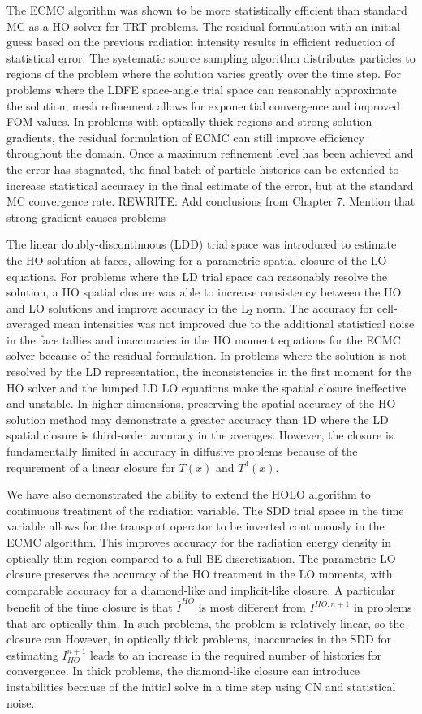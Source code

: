 The ECMC algorithm was shown to be more statistically efficient than standard MC as a HO
solver for TRT problems.  The residual formulation with an initial guess based on the
previous radiation intensity results in efficient reduction of statistical error.  The
systematic source sampling algorithm distributes particles to regions of the problem where the
solution varies greatly over the time step.  For problems where the LDFE space-angle trial space
can reasonably approximate the solution, mesh refinement allows for exponential
convergence and improved FOM values.   In problems with optically
thick regions and strong solution gradients, the residual formulation of ECMC can still
improve efficiency throughout the domain.  Once a maximum refinement level has been
achieved and the error has stagnated, the final batch of particle histories can be 
extended to increase statistical accuracy in the final estimate of the error, but at the
standard MC convergence rate.
REWRITE: Add conclusions from Chapter 7. Mention that strong gradient causes problems

The linear doubly-discontinuous (LDD) trial space was introduced to estimate the HO
solution at faces, allowing for a parametric spatial closure of the LO equations. 
For problems where the LD trial space can reasonably resolve the solution, a 
HO spatial closure was able to increase consistency between the HO and LO solutions and improve
accuracy in the L$_2$ norm.  The accuracy for cell-averaged mean intensities was not improved due to the additional statistical noise
in the face tallies and inaccuracies in the HO moment equations for the ECMC solver because of the residual formulation.
In problems where the solution is not resolved by the LD representation, the
inconsistencies in the first moment for the HO solver and the lumped LD LO equations make
the spatial closure ineffective and unstable.
In higher dimensions, preserving the spatial accuracy of the HO solution method may
demonstrate a greater accuracy than 1D where the LD spatial closure is
third-order accuracy in the averages.  However, the closure is fundamentally limited in
accuracy in diffusive problems because of the requirement of a linear closure for $T(x)$ and $T^4(x)$. 

We have also demonstrated the ability to extend the HOLO algorithm to continuous treatment of the radiation 
variable.  The SDD trial space in the time variable allows for the transport operator to be inverted
continuously in the ECMC algorithm.  This improves accuracy for the radiation energy
density in optically thin region compared to a full BE discretization.  The
parametric LO closure preserves the accuracy of the HO treatment in the LO moments,
with comparable accuracy for a diamond-like and implicit-like closure.  A particular benefit of the time
closure is that $\overline I^{HO}$ is most different from $I^{HO,n+1}$ in problems
that are optically thin.  In such problems, the problem is relatively linear, so the
closure can 
However, in optically thick problems, inaccuracies in the SDD for estimating
$I_{HO}^{n+1}$ leads to an increase in the required number of histories for
convergence.  In thick problems, the diamond-like closure can introduce instabilities
because of the initial solve in a time step using CN and statistical noise.

